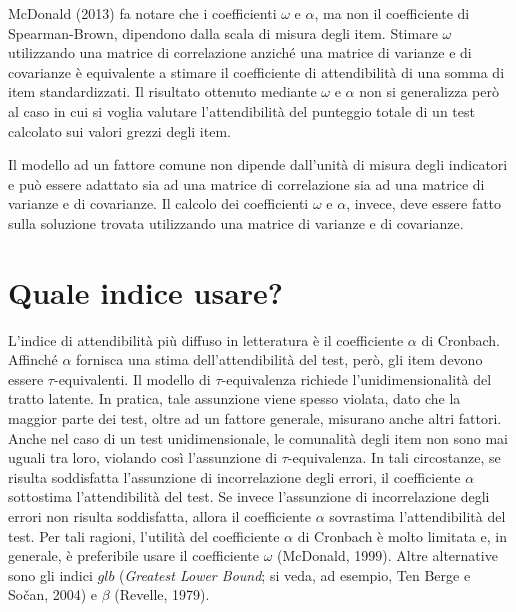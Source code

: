 McDonald (2013) fa notare che i coefficienti $\omega$ e $\alpha$, ma non il coefficiente di Spearman-Brown, dipendono dalla scala di misura degli item. Stimare $\omega$ utilizzando una matrice di correlazione anziché una matrice di varianze e di covarianze è equivalente a stimare il coefficiente di attendibilità di una somma di item standardizzati. Il risultato ottenuto mediante $\omega$ e $\alpha$ non si generalizza però al caso in cui si voglia valutare l'attendibilità del punteggio totale di un test calcolato sui valori grezzi degli item. 

Il modello ad un fattore comune non dipende dall'unità di misura degli indicatori e può essere adattato sia ad una matrice di correlazione sia ad una matrice di varianze e di covarianze. Il calcolo dei coefficienti $\omega$ e $\alpha$, invece, deve essere fatto sulla soluzione trovata utilizzando una matrice di varianze e di covarianze.


\section{Quale indice usare?}


L'indice di attendibilità più diffuso in letteratura è il
  coefficiente $\alpha$ di Cronbach. 
 Affinché $\alpha$ fornisca una stima dell'attendibilità del
  test, però, gli item devono essere $\tau$-equivalenti. 
  Il modello di $\tau$-equivalenza richiede l'unidimensionalità
  del tratto latente.
 In pratica, tale assunzione viene spesso violata, dato che la
  maggior parte dei test, oltre ad un fattore generale, misurano anche
  altri fattori.  
Anche nel caso di un test unidimensionale, le
  comunalità degli item non sono mai uguali tra loro, violando così
  l'assunzione di  $\tau$-equivalenza. 
  In tali circostanze, se risulta soddisfatta l'assunzione di
  incorrelazione degli errori, il coefficiente $\alpha$ sottostima
  l'attendibilità del test.
  Se invece l'assunzione di incorrelazione degli errori non
  risulta soddisfatta, allora il coefficiente $\alpha$ sovrastima
  l'attendibilità del test. 
 Per tali ragioni, l'utilità del coefficiente $\alpha$ di Cronbach è molto limitata e, in generale, è preferibile usare il coefficiente $\omega$ (McDonald, 1999). Altre alternative sono gli indici $glb$ (\textit{Greatest Lower Bound}; si veda, ad esempio, Ten Berge e So\v{c}an, 2004) e $\beta$ (Revelle, 1979).




